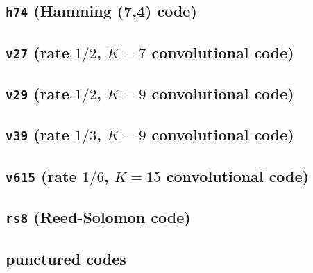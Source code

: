 \subsection{{\tt h74} (Hamming (7,4) code)}
\label{module:fec:h74}

\subsection{{\tt v27} (rate $1/2$, $K=7$ convolutional code)}
\label{module:fec:v27}

\subsection{{\tt v29} (rate $1/2$, $K=9$ convolutional code)}
\label{module:fec:v29}

\subsection{{\tt v39} (rate $1/3$, $K=9$ convolutional code)}
\label{module:fec:v39}

\subsection{{\tt v615} (rate $1/6$, $K=15$ convolutional code)}
\label{module:fec:v615}

\subsection{{\tt rs8} (Reed-Solomon code)}
\label{module:fec:rs8}

\subsection{punctured codes}
\label{module:fec:punctured}

